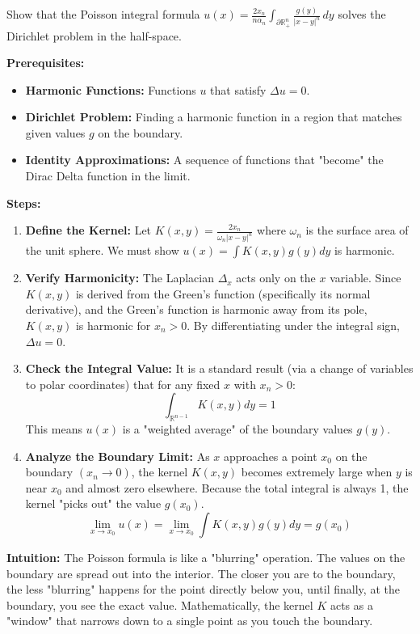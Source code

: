 \begin{exercise}
\label{analysis:2012:6}
Show that the Poisson integral formula $u(x) = \frac{2x_n}{n\alpha_n}\int_{\partial\mathbb{R}_+^n} \frac{g(y)}{|x-y|^n}\,dy$ solves the Dirichlet problem in the half-space.
\end{exercise}

\begin{solution}
\textbf{Prerequisites:}
\begin{itemize}
    \item \textbf{Harmonic Functions:} Functions $u$ that satisfy $\Delta u = 0$.
    \item \textbf{Dirichlet Problem:} Finding a harmonic function in a region that matches given values $g$ on the boundary.
    \item \textbf{Identity Approximations:} A sequence of functions that "become" the Dirac Delta function in the limit.
\end{itemize}

\bigskip

\textbf{Steps:}
\begin{enumerate}
    \item \textbf{Define the Kernel:} Let $K(x, y) = \frac{2x_n}{\omega_n |x-y|^n}$ where $\omega_n$ is the surface area of the unit sphere. We must show $u(x) = \int K(x,y)g(y)dy$ is harmonic.
    
    \item \textbf{Verify Harmonicity:} The Laplacian $\Delta_x$ acts only on the $x$ variable. Since $K(x,y)$ is derived from the Green's function (specifically its normal derivative), and the Green's function is harmonic away from its pole, $K(x,y)$ is harmonic for $x_n > 0$. By differentiating under the integral sign, $\Delta u = 0$.

    \item \textbf{Check the Integral Value:} It is a standard result (via a change of variables to polar coordinates) that for any fixed $x$ with $x_n > 0$:
    \[ \int_{\mathbb{R}^{n-1}} K(x, y) dy = 1 \]
    This means $u(x)$ is a "weighted average" of the boundary values $g(y)$.

    \item \textbf{Analyze the Boundary Limit:} As $x$ approaches a point $x_0$ on the boundary $(x_n \to 0)$, the kernel $K(x,y)$ becomes extremely large when $y$ is near $x_0$ and almost zero elsewhere. 
    Because the total integral is always 1, the kernel "picks out" the value $g(x_0)$.
    \[ \lim_{x \to x_0} u(x) = \lim_{x \to x_0} \int K(x,y) g(y) dy = g(x_0) \]
\end{enumerate}

\bigskip

\textbf{Intuition:} 
The Poisson formula is like a "blurring" operation. The values on the boundary are spread out into the interior. The closer you are to the boundary, the less "blurring" happens for the point directly below you, until finally, at the boundary, you see the exact value. Mathematically, the kernel $K$ acts as a "window" that narrows down to a single point as you touch the boundary.
\end{solution}

